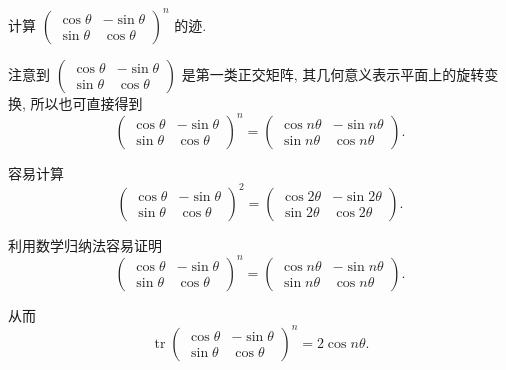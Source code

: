 \documentclass[../../main.tex]{subfiles}%
\begin{document}
\begin{example}
计算 $\begin{pmatrix} \cos\theta & -\sin\theta \\ \sin\theta & \cos\theta \end{pmatrix}^n$ 的迹.
\end{example}
\begin{remark}
注意到 $\begin{pmatrix} \cos\theta & -\sin\theta \\ \sin\theta & \cos\theta \end{pmatrix}$ 是第一类正交矩阵, 其几何意义表示平面上的旋转变换, 所以也可直接得到
$$
\begin{pmatrix} \cos\theta & -\sin\theta \\ \sin\theta & \cos\theta \end{pmatrix}^n = \begin{pmatrix} \cos n\theta & -\sin n\theta \\ \sin n\theta & \cos n\theta \end{pmatrix}.
$$
\end{remark}
\begin{solution}
容易计算
$$
\begin{pmatrix} \cos\theta & -\sin\theta \\ \sin\theta & \cos\theta \end{pmatrix}^2 = \begin{pmatrix} \cos2\theta & -\sin2\theta \\ \sin2\theta & \cos2\theta \end{pmatrix}.
$$

利用数学归纳法容易证明
$$
\begin{pmatrix} \cos\theta & -\sin\theta \\ \sin\theta & \cos\theta \end{pmatrix}^n = \begin{pmatrix} \cos n\theta & -\sin n\theta \\ \sin n\theta & \cos n\theta \end{pmatrix}.
$$

从而
$$
\operatorname{tr}\begin{pmatrix} \cos\theta & -\sin\theta \\ \sin\theta & \cos\theta \end{pmatrix}^n = 2\cos n\theta.
$$

\end{solution}
\end{document}
